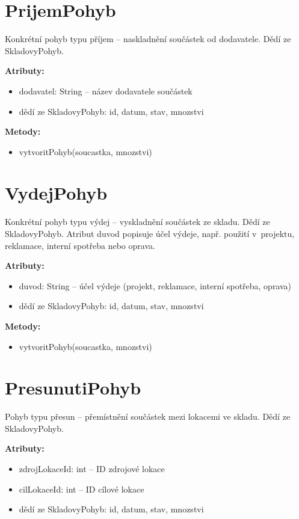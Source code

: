 \section{PrijemPohyb}

Konkrétní pohyb typu příjem -- naskladnění součástek od dodavatele. Dědí ze SkladovyPohyb.

\textbf{Atributy:}\begin{itemize}[noitemsep,topsep=2pt]\item dodavatel: String – název dodavatele součástek\item dědí ze SkladovyPohyb: id, datum, stav, mnozstvi\end{itemize}

\textbf{Metody:}\begin{itemize}[noitemsep,topsep=2pt]\item vytvoritPohyb(soucastka, mnozstvi)\end{itemize}

\section{VydejPohyb}

Konkrétní pohyb typu výdej -- vyskladnění součástek ze skladu. Dědí ze SkladovyPohyb. Atribut duvod popisuje účel výdeje, např. použití v~projektu, reklamace, interní spotřeba nebo oprava.

\textbf{Atributy:}\begin{itemize}[noitemsep,topsep=2pt]\item duvod: String – účel výdeje (projekt, reklamace, interní spotřeba, oprava)\item dědí ze SkladovyPohyb: id, datum, stav, mnozstvi\end{itemize}

\textbf{Metody:}\begin{itemize}[noitemsep,topsep=2pt]\item vytvoritPohyb(soucastka, mnozstvi)\end{itemize}

\clearpage
\section{PresunutiPohyb}

Pohyb typu přesun -- přemístnění součástek mezi lokacemi ve skladu. Dědí ze SkladovyPohyb.

\textbf{Atributy:}\begin{itemize}[noitemsep,topsep=2pt]\item zdrojLokaceId: int – ID zdrojové lokace\item cilLokaceId: int – ID cílové lokace\item dědí ze SkladovyPohyb: id, datum, stav, mnozstvi\end{itemize}

